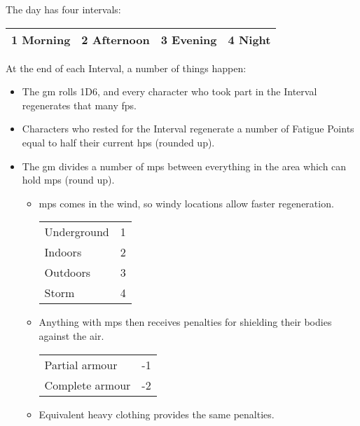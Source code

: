 The day has four intervals:

\vspace{1em}
\begin{tabularx}{\linewidth}{c|c|c|c}

  \hline
  1 \textbf{Morning} & 2 \textbf{Afternoon} & 3 \textbf{Evening} & 4 \textbf{Night} \\
  \hline
\end{tabularx}
\vspace{1em}

At the end of each Interval, a number of things happen:

\begin{itemize}
  \item
  The \gls{gm} rolls 1D6, and every character who took part in the Interval regenerates that many \glspl{fp}.
  \item
  Characters who rested for the Interval regenerate a number of Fatigue Points equal to half their current \glspl{hp} (rounded up).
  \item
  The \gls{gm} divides a number of \glspl{mp} between everything in the area which can hold \glspl{mp} (round up).
  \begin{itemize}
    \item
    \Glspl{mp} comes in the wind, so windy locations allow faster regeneration.

    \begin{tabularx}{\linewidth}{Xc}
    \hline
    Underground & 1 \\
    Indoors     & 2 \\
    Outdoors    & 3 \\
    Storm       & 4 \\
    \hline
    \end{tabularx}
    \item
    Anything with \glspl{mp} then receives penalties for shielding their bodies against the air.

    \begin{tabularx}{\linewidth}{Xc}
    \hline
    Partial armour  & -1 \\
    Complete armour & -2 \\
    \hline
    \end{tabularx}
    \item
    Equivalent heavy clothing provides the same penalties.
  \end{itemize}
\end{itemize}
